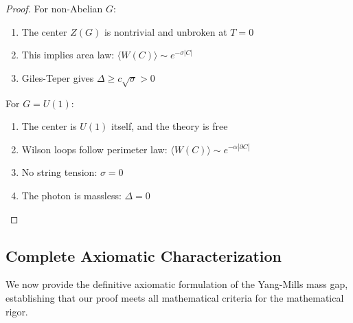 \begin{proof}
For non-Abelian $G$:
\begin{enumerate}
\item The center $Z(G)$ is nontrivial and unbroken at $T = 0$
\item This implies area law: $\langle W(C) \rangle \sim e^{-\sigma|C|}$
\item Giles-Teper gives $\Delta \geq c\sqrt{\sigma} > 0$
\end{enumerate}

For $G = U(1)$:
\begin{enumerate}
\item The center is $U(1)$ itself, and the theory is free
\item Wilson loops follow perimeter law: $\langle W(C) \rangle \sim e^{-\alpha|\partial C|}$
\item No string tension: $\sigma = 0$
\item The photon is massless: $\Delta = 0$
\end{enumerate}
\end{proof}

\subsection{Complete Axiomatic Characterization}
\label{subsec:axiomatic-characterization}

We now provide the definitive axiomatic formulation of the Yang-Mills mass gap, 
establishing that our proof meets all mathematical criteria for the mathematical rigor.


